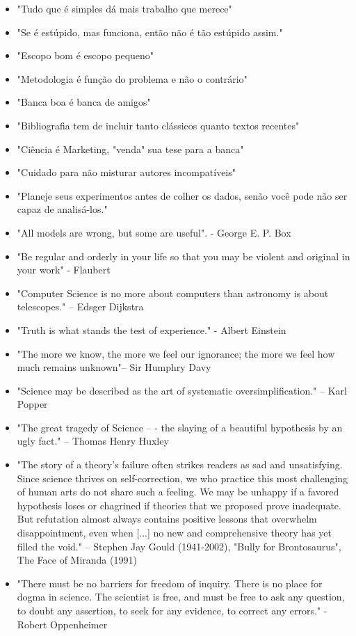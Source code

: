 \begin{itemize}
\item	"Tudo que é simples dá mais trabalho que merece"
\item	"Se é estúpido, mas funciona, então não é tão estúpido assim."
\item	"Escopo bom é escopo pequeno"
\item	"Metodologia é função do problema e não o contrário"
\item	"Banca boa é banca de amigos"
\item	"Bibliografia tem de incluir tanto clássicos quanto textos recentes"
\item	"Ciência é Marketing, "venda" sua tese para a banca"
\item	"Cuidado para não misturar autores incompatíveis"
\item	"Planeje seus experimentos antes de colher os dados, senão você pode não ser capaz de analisá-los."
\item	"All models are wrong, but some are useful". - George E. P. Box
\item	"Be regular and orderly in your life so that you may be violent and original in your work" - Flaubert
\item	"Computer Science is no more about computers than astronomy is about telescopes." – Edsger Dijkstra
\item	"Truth is what stands the test of experience." - Albert Einstein
\item	"The more we know, the more we feel our ignorance; the more we feel how much remains unknown"– Sir Humphry Davy
\item	"Science may be described as the art of systematic oversimplification." –  Karl Popper
\item	"The great tragedy of Science – - the slaying of a beautiful hypothesis by an ugly fact." –  Thomas Henry Huxley
\item	"The story of a theory's failure often strikes readers as sad and unsatisfying. Since science thrives on self-correction, we who practice this most challenging of human arts do not share such a feeling. We may be unhappy if a favored hypothesis loses or chagrined if theories that we proposed prove inadequate. But refutation almost always contains positive lessons that overwhelm disappointment, even when [...] no new and comprehensive theory has yet filled the void." –  Stephen Jay Gould (1941-2002), "Bully for Brontosaurus", The Face of Miranda (1991)
\item	"There must be no barriers for freedom of inquiry. There is no place for dogma in science. The scientist is free, and must be free to ask any question, to doubt any assertion, to seek for any evidence, to correct any errors." - Robert Oppenheimer

\end{itemize}
